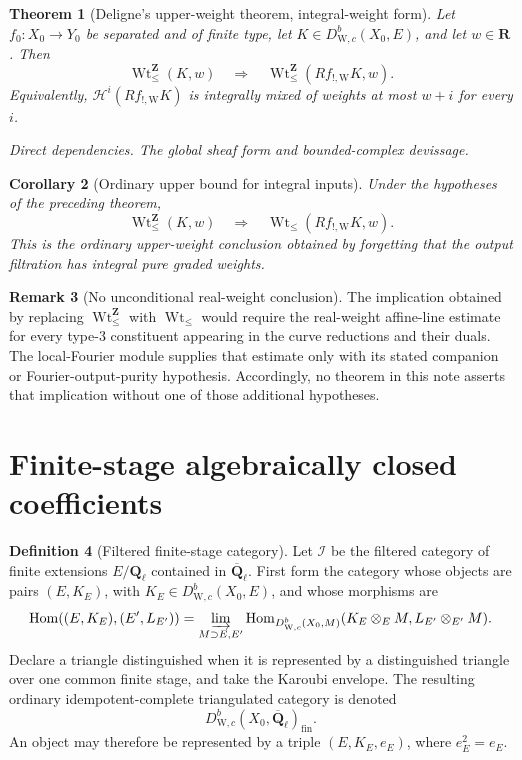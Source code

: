 \documentclass[10pt]{article}
\newtheorem{theorem}{Theorem}[section]
\newtheorem{corollary}[theorem]{Corollary}
\theoremstyle{definition}
\newtheorem{definition}[theorem]{Definition}
\newtheorem{remark}[theorem]{Remark}
\newcommand{\Ql}{\mathbf Q_\ell}
\newcommand{\Qlb}{\overline{\mathbf Q}_\ell}
\newcommand{\DW}{D^b_{\mathrm W,c}}
\newcommand{\WtLe}{\operatorname{Wt}_{\leq}}
\newcommand{\IntWtLe}{\operatorname{Wt}^{\mathbf Z}_{\leq}}
\newcommand{\dep}[1]{\par\smallskip\noindent\textit{Direct dependencies.} #1\par}
\begin{document}
\begin{theorem}[Deligne's upper-weight theorem, integral-weight form]
Let \(f_0:X_0\to Y_0\) be separated and of finite type, let
\(K\in\DW(X_0,E)\), and let \(w\in\mathbf R\).  Then
\[
 \boxed{\qquad
      \IntWtLe(K,w)\quad\Longrightarrow\quad
      \IntWtLe(Rf_{!,\mathrm W}K,w).
 \qquad}
\]
Equivalently, \(\mathcal H^i(Rf_{!,\mathrm W}K)\) is integrally mixed of
weights at most \(w+i\) for every \(i\).
\dep{The global sheaf form and bounded-complex devissage.}
\end{theorem}

\begin{corollary}[Ordinary upper bound for integral inputs]
Under the hypotheses of the preceding theorem,
\[
          \IntWtLe(K,w)\quad\Longrightarrow\quad
          \WtLe(Rf_{!,\mathrm W}K,w).
\]
This is the ordinary upper-weight conclusion obtained by forgetting that
the output filtration has integral pure graded weights.
\end{corollary}

\begin{remark}[No unconditional real-weight conclusion]
The implication obtained by replacing \(\IntWtLe\) with \(\WtLe\) would
require the real-weight affine-line estimate for every type-3 constituent
appearing in the curve reductions and their duals.  The local-Fourier
module supplies that estimate only with its stated companion or
Fourier-output-purity hypothesis.  Accordingly, no theorem in this note
asserts that implication without one of those additional hypotheses.
\end{remark}

\section{Finite-stage algebraically closed coefficients}

\begin{definition}[Filtered finite-stage category]
Let \(\mathcal I\) be the filtered category of finite extensions
\(E/\Ql\) contained in \(\Qlb\).  First form the category whose objects are
pairs \((E,K_E)\), with \(K_E\in\DW(X_0,E)\), and whose morphisms are
\[
 \operatorname{Hom}((E,K_E),(E',L_{E'}))
 =\varinjlim_{M\supset E,E'}
 \operatorname{Hom}_{\DW(X_0,M)}
 (K_E\otimes_EM,L_{E'}\otimes_{E'}M).
\]
Declare a triangle distinguished when it is represented by a distinguished
triangle over one common finite stage, and take the Karoubi envelope.  The
resulting ordinary idempotent-complete triangulated category is denoted
\[
                       \DW(X_0,\Qlb)_{\mathrm{fin}}.
\]
An object may therefore be represented by a triple \((E,K_E,e_E)\), where
\(e_E^2=e_E\).
\end{definition}
\end{document}
